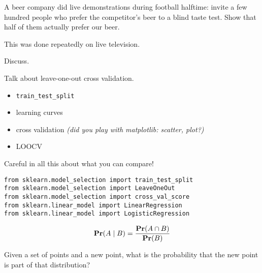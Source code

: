 
\usepackage{epsfig}
\usepackage{bbm}





A beer company did live demonstrations during football halftime:
invite a few hundred people who prefer the competitor's beer to a
blind taste test.  Show that half of them actually prefer our beer.

This was done repeatedly on live television.

Discuss.



Talk about leave-one-out cross validation.

\begin{itemize}
\item \texttt{train\_test\_split}
\item learning curves
\item cross validation \textit{(did you play with matplotlib: scatter,
  plot?)}
\item LOOCV
\end{itemize}

Careful in all this about what you can compare!

\begin{verbatim}
from sklearn.model_selection import train_test_split
from sklearn.model_selection import LeaveOneOut
from sklearn.model_selection import cross_val_score
from sklearn.linear_model import LinearRegression
from sklearn.linear_model import LogisticRegression
\end{verbatim}



\begin{defn}[Kolmogorov]
  \begin{displaymath}
    \mathbf{Pr}(A\mid B) = \frac{\mathbf{Pr}(A\cap B)}{\mathbf{Pr}(B)}
  \end{displaymath}
\end{defn}

\begin{example}
  Given a set of points and a new point, what is the probability that
  the new point is part of that distribution?
\end{example}

